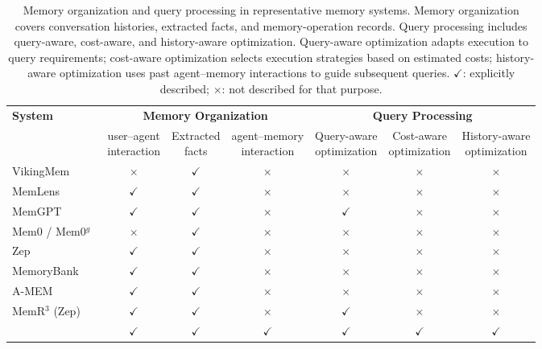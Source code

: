 \begin{table}[t]
\centering
\small
\caption{
Memory organization and query processing in representative memory systems. Memory organization covers conversation histories, extracted facts, and memory-operation records. Query processing includes query-aware, cost-aware, and history-aware optimization. Query-aware optimization adapts execution to query requirements; cost-aware optimization selects execution strategies based on estimated costs; history-aware optimization uses past agent–memory interactions to guide subsequent queries.
$\checkmark$: explicitly described; $\times$: not described for that purpose.}
\label{tbl:positioning}
\setlength{\tabcolsep}{5pt}
\renewcommand{\arraystretch}{1.15}
\begin{tabular}{@{}lcccccc@{}}
\toprule
\multirow{2}{*}{\textbf{System}} & \multicolumn{3}{c}{\textbf{Memory Organization}}
  & \multicolumn{3}{c}{\textbf{Query Processing}}\\
\cmidrule(lr){2-4}\cmidrule(l){5-7}
& \makecell{user--agent\\interaction} & \makecell{Extracted\\facts}
& \makecell{agent--memory\\interaction}
& \makecell{Query-aware\\optimization}
& \makecell{Cost-aware\\optimization}
& \makecell{History-aware\\optimization}\\
\midrule
VikingMem~\cite{vikingmem} & $\times$ & $\checkmark$ & $\times$ & $\times$ & $\times$ & $\times$\\
MemLens~\cite{memlens} & $\checkmark$ & $\checkmark$ & $\times$ & $\times$ & $\times$ & $\times$\\
MemGPT~\cite{memgpt} & $\checkmark$ & $\checkmark$ & $\times$ & $\checkmark$ & $\times$ & $\times$\\
Mem0 / Mem0$^g$~\cite{mem0} & $\times$ & $\checkmark$ & $\times$ & $\times$ & $\times$ & $\times$\\
Zep~\cite{zep} & $\checkmark$ & $\checkmark$ & $\times$ & $\times$ & $\times$ & $\times$\\
MemoryBank~\cite{memorybank} & $\checkmark$ & $\checkmark$ & $\times$ & $\times$ & $\times$ & $\times$\\
A-MEM~\cite{agenticmem} & $\checkmark$ & $\checkmark$ & $\times$ & $\times$ & $\times$ & $\times$\\
MemR$^3$ (Zep)~\cite{memr3} & $\checkmark$ & $\checkmark$ & $\times$ & $\checkmark$ & $\times$ & $\times$\\
\midrule
\rowcolor{lightblue}
\textbf{\sys{}} & $\checkmark$ & $\checkmark$ & $\checkmark$
& $\checkmark$ & $\checkmark$ & $\checkmark$\\
\bottomrule
\end{tabular}
\end{table}
